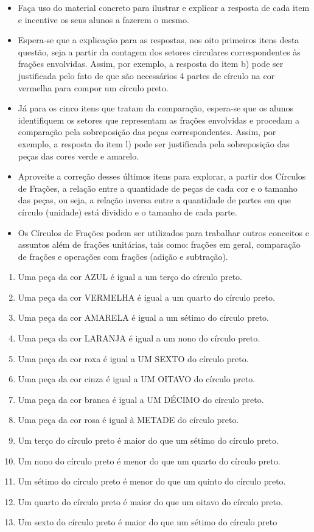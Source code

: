 \begin{atividade}
\begin{itemize}
    \item Faça uso do material concreto para ilustrar e explicar a resposta de cada item e incentive os seus alunos a fazerem o mesmo.
    \item Espera-se que a explicação para as respostas, nos oito primeiros itens desta questão, seja a partir da contagem dos setores circulares correspondentes às frações envolvidas. Assim, por exemplo, a resposta do item b) pode ser justificada pelo fato de que são necessários 4 partes de círculo na cor vermelha para compor um círculo preto.
    \item Já para os cinco itens que tratam da comparação, espera-se que os alunos identifiquem os setores que representam as frações envolvidas e procedam a comparação pela sobreposição das peças correspondentes. Assim, por exemplo, a resposta do item l) pode ser justificada pela sobreposição das peças das cores verde e amarelo.
    \item Aproveite a correção desses últimos itens para explorar, a partir dos Círculos de Frações, a relação entre a quantidade de peças de cada cor e o tamanho das peças, ou seja, a relação inversa entre a quantidade de partes em que círculo (unidade) está dividido e o tamanho de cada parte.
    \item Os Círculos de Frações podem ser utilizados para trabalhar outros conceitos e assuntos além de frações unitárias, tais como: frações em geral, comparação de frações e operações com frações (adição e subtração). 
    \end{itemize}

\solucao
\begin{enumerate}
 \item Uma peça da cor AZUL é igual a um terço do círculo preto.
 \item    Uma peça da cor VERMELHA é igual a um quarto do círculo preto.
 \item    Uma peça da cor AMARELA é igual a um sétimo do círculo preto.
 \item    Uma peça da cor LARANJA é igual a um nono do círculo preto.
 \item    Uma peça da cor roxa é igual a UM SEXTO do círculo preto.
 \item    Uma peça da cor cinza é igual a UM OITAVO do círculo preto.
 \item    Uma peça da cor branca é igual a UM DÉCIMO do círculo preto.
 \item    Uma peça da cor rosa é igual à METADE do círculo preto.
 \item    Um terço do círculo preto é maior do que um sétimo do círculo preto.
 \item    Um nono do círculo preto é menor do que um quarto do círculo preto.
 \item    Um sétimo do círculo preto é menor do que um quinto do círculo preto.
 \item    Um quarto do círculo preto é maior do que um oitavo do círculo preto.
 \item    Um sexto do círculo preto é maior do que um sétimo do círculo preto
\end{enumerate}

\end{atividade}

